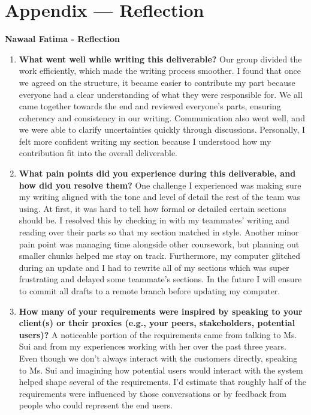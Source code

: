 \documentclass[12pt]{article}
\begin{document}
\section*{Appendix --- Reflection}





\textbf{Nawaal Fatima - Reflection}
\begin{enumerate}
  \item \textbf{What went well while writing this deliverable?} \newline
    Our group divided the work efficiently, which made the writing
    process smoother. I found that once we agreed on the structure,
    it became easier to contribute my part because everyone had a
    clear understanding of what they were responsible for.
    We all came together towards the end and reviewed everyone's
    parts, ensuring coherency and consistency in our writing.
    Communication also went well, and we were able to clarify
    uncertainties quickly through discussions. Personally, I felt
    more confident writing my section because I understood how my
    contribution fit into the overall deliverable.

  \item \textbf{What pain points did you experience during this
    deliverable, and how did you resolve them?} \newline
    One challenge I experienced was making sure my writing aligned
    with the tone and level of detail the rest of the team was using.
    At first, it was hard to tell how formal or detailed certain
    sections should be. I resolved this by checking in with my teammates'
    writing and reading over their parts so that my section matched in style.
    Another minor pain point was managing time alongside other
    coursework, but planning out smaller chunks helped me stay on track.
    Furthermore, my computer glitched during an update and I had to
    rewrite all of my sections which was super frustrating and
    delayed some teammate's sections. In the future I will ensure to
    commit all drafts to a remote branch before updating my computer.

  \item \textbf{How many of your requirements were inspired by
      speaking to your client(s) or their proxies (e.g., your peers,
    stakeholders, potential users)?} \newline
    A noticeable portion of the requirements came from talking to
    Ms. Sui and from my experiences working with her over the past
    three years. Even though we don't always interact with the customers
    directly, speaking to Ms. Sui and imagining how potential users
    would interact with the system helped shape several of the
    requirements. I'd estimate that roughly half of the requirements
    were influenced by those conversations or by feedback from people
    who could represent the end users.


\end{enumerate}
\end{document}
